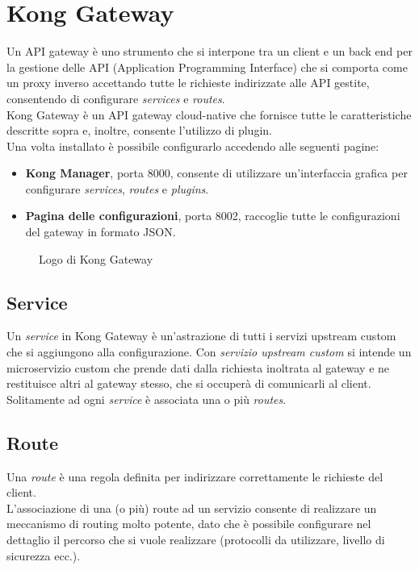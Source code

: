 \section{Kong Gateway}
Un API gateway è uno strumento che si interpone tra un client e un back end per la gestione delle API (Application Programming Interface) che si comporta come un proxy inverso accettando tutte le richieste indirizzate alle API gestite, consentendo di configurare \emph{services} e \emph{routes}.\\
Kong Gateway è un API gateway cloud-native che fornisce tutte le caratteristiche descritte sopra e, inoltre, consente l’utilizzo di plugin.\\
Una volta installato è possibile configurarlo accedendo alle seguenti pagine:
\begin{itemize}
	\item \textbf{Kong Manager}, porta 8000, consente di utilizzare un’interfaccia grafica per configurare \emph{services}, \emph{routes} e \emph{plugins}.
	\item \textbf{Pagina delle configurazioni}, porta 8002, raccoglie tutte le configurazioni del gateway in formato JSON.
\end{itemize}
\begin{figure}[ht]
	\centering
	\caption{Logo di Kong Gateway}
	\label{fig:one}
\end{figure}
\subsection{Service}
Un \emph{service} in Kong Gateway è un’astrazione di tutti i servizi upstream custom che si aggiungono alla configurazione. Con \emph{servizio upstream custom} si intende un microservizio custom che prende dati dalla richiesta inoltrata al gateway e ne restituisce altri al gateway stesso, che si occuperà di comunicarli al client.\\
Solitamente ad ogni \emph{service} è associata una o più \emph{routes}.\\

\subsection{Route}
Una \emph{route} è una regola definita per indirizzare correttamente le richieste del client.\\
L’associazione di una (o più) route ad un servizio consente di realizzare un meccanismo di routing molto potente, dato che è possibile configurare nel dettaglio il percorso che si vuole realizzare (protocolli da utilizzare, livello di sicurezza ecc.).\\

